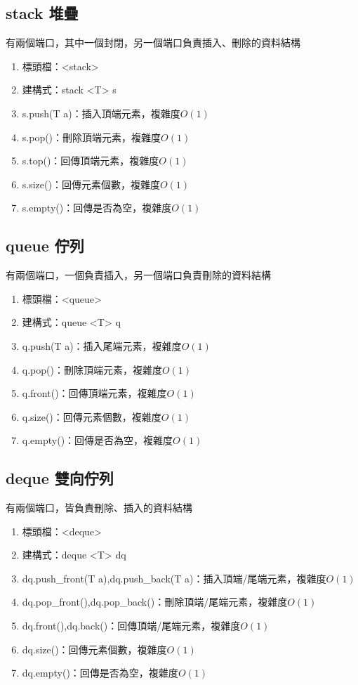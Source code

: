 \subsection{stack 堆疊}
有兩個端口，其中一個封閉，另一個端口負責插入、刪除的資料結構

\begin{enumerate}
\item 標頭檔：<stack>
\item 建構式：stack <T> s
\item s.push(T a)：插入頂端元素，複雜度$O(1)$
\item s.pop()：刪除頂端元素，複雜度$O(1)$
\item s.top()：回傳頂端元素，複雜度$O(1)$
\item s.size()：回傳元素個數，複雜度$O(1)$
\item s.empty()：回傳是否為空，複雜度$O(1)$
\end{enumerate}

\subsection{queue 佇列} 
有兩個端口，一個負責插入，另一個端口負責刪除的資料結構

\begin{enumerate}
\item 標頭檔：<queue>
\item 建構式：queue <T> q
\item q.push(T a)：插入尾端元素，複雜度$O(1)$
\item q.pop()：刪除頂端元素，複雜度$O(1)$
\item q.front()：回傳頂端元素，複雜度$O(1)$
\item q.size()：回傳元素個數，複雜度$O(1)$
\item q.empty()：回傳是否為空，複雜度$O(1)$
\end{enumerate}

\subsection{deque 雙向佇列} 
有兩個端口，皆負責刪除、插入的資料結構
\begin{enumerate}
\item 標頭檔：<deque>
\item 建構式：deque <T> dq
\item dq.push\_front(T a),dq.push\_back(T a)：插入頂端/尾端元素，複雜度$O(1)$
\item dq.pop\_front(),dq.pop\_back()：刪除頂端/尾端元素，複雜度$O(1)$
\item dq.front(),dq.back()：回傳頂端/尾端元素，複雜度$O(1)$
\item dq.size()：回傳元素個數，複雜度$O(1)$
\item dq.empty()：回傳是否為空，複雜度$O(1)$
\end{enumerate}
